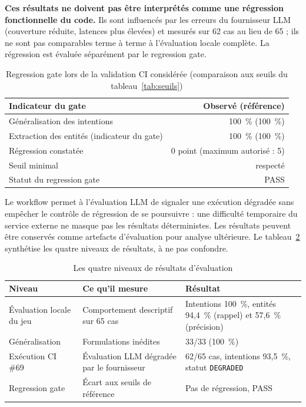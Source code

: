 \documentclass[11pt,a4paper,openany,oneside]{report}
\begin{document}
\textbf{Ces résultats ne doivent pas être interprétés comme une régression fonctionnelle du code.} Ils sont influencés par les erreurs du fournisseur LLM (couverture réduite, latences plus élevées) et mesurés sur 62 cas au lieu de 65 ; ils ne sont pas comparables terme à terme à l'évaluation locale complète. La régression est évaluée séparément par le regression gate.

\begin{table}[htbp]
\centering\small
\caption{Regression gate lors de la validation CI considérée (comparaison aux seuils du tableau~\ref{tab:seuils})}\label{tab:gate-res}
\begin{tabularx}{\textwidth}{@{}Xr@{}}
\toprule
\textbf{Indicateur du gate} & \textbf{Observé (référence)} \\
\midrule
Généralisation des intentions & 100~\% (100~\%) \\
Extraction des entités (indicateur du gate) & 100~\% (100~\%) \\
Régression constatée & 0 point (maximum autorisé : 5) \\
Seuil minimal & respecté \\
Statut du regression gate & PASS \\
\bottomrule
\end{tabularx}
\end{table}

Le workflow permet à l'évaluation LLM de signaler une exécution dégradée sans empêcher le contrôle de régression de se poursuivre : une difficulté temporaire du service externe ne masque pas les résultats déterministes. Les résultats peuvent être conservés comme artefacts d'évaluation pour analyse ultérieure. Le tableau~\ref{tab:niveaux} synthétise les quatre niveaux de résultats, à ne pas confondre.

\begin{table}[htbp]
\centering\small
\caption{Les quatre niveaux de résultats d'évaluation}\label{tab:niveaux}
\begin{tabularx}{\textwidth}{@{}p{3.3cm}p{4.6cm}X@{}}
\toprule
\textbf{Niveau} & \textbf{Ce qu'il mesure} & \textbf{Résultat} \\
\midrule
Évaluation locale du jeu & Comportement descriptif sur 65 cas & Intentions 100~\%, entités 94,4~\% (rappel) et 57,6~\% (précision) \\
Généralisation & Formulations inédites & 33/33 (100~\%) \\
Exécution CI \#69 & Évaluation LLM dégradée par le fournisseur & 62/65 cas, intentions 93,5~\%, statut \texttt{DEGRADED} \\
Regression gate & Écart aux seuils de référence & Pas de régression, PASS \\
\bottomrule
\end{tabularx}
\end{table}
\end{document}
